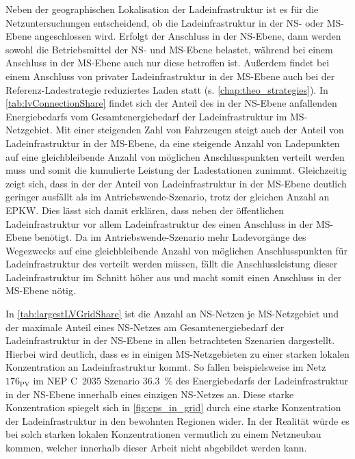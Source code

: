 Neben der geographischen Lokalisation der Ladeinfrastruktur ist es für die Netzuntersuchungen entscheidend, ob die Ladeinfrastruktur in der \gls{NS}- oder \gls{MS}-Ebene angeschlossen wird.
Erfolgt der Anschluss in der \gls{NS}-Ebene, dann werden sowohl die Betriebsmittel der \gls{NS}- und \gls{MS}-Ebene belastet, während bei einem Anschluss in der \gls{MS}-Ebene auch nur diese betroffen ist.
Außerdem findet bei einem Anschluss von privater Ladeinfrastruktur in der \gls{MS}-Ebene auch bei der Referenz-Ladestrategie reduziertes Laden statt (s. \autoref{chap:theo_strategies}).
In \autoref{tab:lvConnectionShare} findet sich der Anteil des in der \gls{NS}-Ebene anfallenden Energiebedarfs vom Gesamtenergiebedarf der Ladeinfrastruktur im \gls{MS}-Netzgebiet.
Mit einer steigenden Zahl von Fahrzeugen steigt auch der Anteil von Ladeinfrastruktur in der \gls{MS}-Ebene, da eine steigende Anzahl von Ladepunkten auf eine gleichbleibende Anzahl von möglichen Anschlusspunkten verteilt werden muss und somit die kumulierte Leistung der Ladestationen zunimmt.
Gleichzeitig zeigt sich, dass in der \SzeFirmenparkplatz der Anteil von Ladeinfrastruktur in der \gls{MS}-Ebene deutlich geringer ausfällt als im Antriebswende-Szenario, trotz der gleichen Anzahl an \gls{EPKW}.
Dies lässt sich damit erklären, dass neben der öffentlichen Ladeinfrastruktur vor allem Ladeinfrastruktur des \UC \Firmeparkplatz einen Anschluss in der \gls{MS}-Ebene benötigt.
Da im Antriebswende-Szenario mehr Ladevorgänge des Wegezwecks \Arbeit auf eine gleichbleibende Anzahl von möglichen Anschlusspunkten für Ladeinfrastruktur des \UC \Firmeparkplatz verteilt werden müssen, fällt die Anschlussleistung dieser Ladeinfrastruktur im Schnitt höher aus und macht somit einen Anschluss in der \gls{MS}-Ebene nötig.



In \autoref{tab:largestLVGridShare} ist die Anzahl an \gls{NS}-Netzen je \gls{MS}-Netzgebiet und der maximale Anteil eines \gls{NS}-Netzes am Gesamtenergiebedarf der Ladeinfrastruktur in der \gls{NS}-Ebene in allen betrachteten Szenarien dargestellt.
Hierbei wird deutlich, dass es in einigen \gls{MS}-Netzgebieten zu einer starken lokalen Konzentration an Ladeinfrastruktur kommt.
So fallen beispielsweise im Netz \(176_{\text{PV}}\) im NEP C~\num{2035} Szenario \SI{36.3}{\percent} des Energiebedarfs der Ladeinfrastruktur in der \gls{NS}-Ebene innerhalb eines einzigen \gls{NS}-Netzes an.
Diese starke Konzentration spiegelt sich in \autoref{fig:cps_in_grid} durch eine starke Konzentration der Ladeinfrastruktur in den bewohnten Regionen wider.
In der Realität würde es bei solch starken lokalen Konzentrationen vermutlich zu einem Netzneubau kommen, welcher innerhalb dieser Arbeit nicht abgebildet werden kann.


